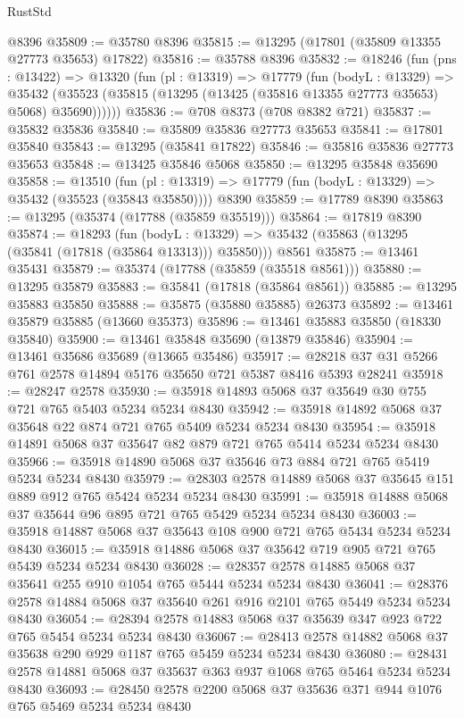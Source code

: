 \begin{lexlean}{RustStd}
\begin{coremodule}
    @8396
@35809 := @35780 @8396
@35815 := @13295 (@17801 (@35809 @13355 @27773 @35653) @17822)
@35816 := @35788 @8396
@35832 := @18246
    (fun (pns : @13422) =>
    @13320
      (fun (pl : @13319) =>
      @17779
        (fun (bodyL : @13329) =>
        @35432 (@35523 (@35815 (@13295 (@13425 (@35816 @13355 @27773 @35653) @5068) @35690))))))
@35836 := @708 @8373 (@708 @8382 @721)
@35837 := @35832 @35836
@35840 := @35809 @35836 @27773 @35653
@35841 := @17801 @35840
@35843 := @13295 (@35841 @17822)
@35846 := @35816 @35836 @27773 @35653
@35848 := @13425 @35846 @5068
@35850 := @13295 @35848 @35690
@35858 := @13510
    (fun (pl : @13319) => @17779 (fun (bodyL : @13329) => @35432 (@35523 (@35843 @35850))))
    @8390
@35859 := @17789 @8390
@35863 := @13295 (@35374 (@17788 (@35859 @35519)))
@35864 := @17819 @8390
@35874 := @18293
    (fun (bodyL : @13329) => @35432 (@35863 (@13295 (@35841 (@17818 (@35864 @13313))) @35850)))
    @8561
@35875 := @13461 @35431
@35879 := @35374 (@17788 (@35859 (@35518 @8561)))
@35880 := @13295 @35879
@35883 := @35841 (@17818 (@35864 @8561))
@35885 := @13295 @35883 @35850
@35888 := @35875 (@35880 @35885) @26373
@35892 := @13461 @35879 @35885 (@13660 @35373)
@35896 := @13461 @35883 @35850 (@18330 @35840)
@35900 := @13461 @35848 @35690 (@13879 @35846)
@35904 := @13461 @35686 @35689 (@13665 @35486)
@35917 := @28218 @37 @31 @5266 @761 @2578 @14894 @5176 @35650 @721 @5387 @8416 @5393 @28241
@35918 := @28247 @2578
@35930 := @35918 @14893 @5068 @37 @35649 @30 @755 @721 @765 @5403 @5234 @5234 @8430
@35942 := @35918 @14892 @5068 @37 @35648 @22 @874 @721 @765 @5409 @5234 @5234 @8430
@35954 := @35918 @14891 @5068 @37 @35647 @82 @879 @721 @765 @5414 @5234 @5234 @8430
@35966 := @35918 @14890 @5068 @37 @35646 @73 @884 @721 @765 @5419 @5234 @5234 @8430
@35979 := @28303 @2578 @14889 @5068 @37 @35645 @151 @889 @912 @765 @5424 @5234 @5234 @8430
@35991 := @35918 @14888 @5068 @37 @35644 @96 @895 @721 @765 @5429 @5234 @5234 @8430
@36003 := @35918 @14887 @5068 @37 @35643 @108 @900 @721 @765 @5434 @5234 @5234 @8430
@36015 := @35918 @14886 @5068 @37 @35642 @719 @905 @721 @765 @5439 @5234 @5234 @8430
@36028 := @28357 @2578 @14885 @5068 @37 @35641 @255 @910 @1054 @765 @5444 @5234 @5234 @8430
@36041 := @28376 @2578 @14884 @5068 @37 @35640 @261 @916 @2101 @765 @5449 @5234 @5234 @8430
@36054 := @28394 @2578 @14883 @5068 @37 @35639 @347 @923 @722 @765 @5454 @5234 @5234 @8430
@36067 := @28413 @2578 @14882 @5068 @37 @35638 @290 @929 @1187 @765 @5459 @5234 @5234 @8430
@36080 := @28431 @2578 @14881 @5068 @37 @35637 @363 @937 @1068 @765 @5464 @5234 @5234 @8430
@36093 := @28450 @2578 @2200 @5068 @37 @35636 @371 @944 @1076 @765 @5469 @5234 @5234 @8430

\end{coremodule}
\end{lexlean}
